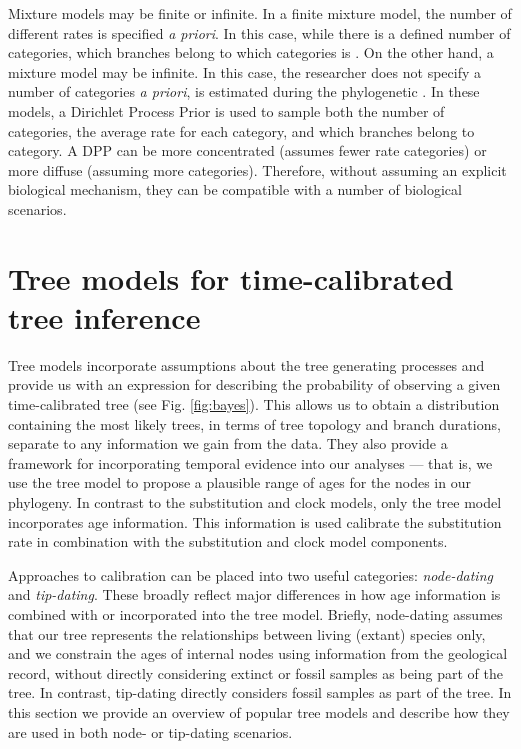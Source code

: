 Mixture models may be finite or infinite.
In a finite mixture model, the number of different rates is specified \textit{a priori}.
In this case, while there is a defined number of categories, which branches belong to which categories is .
On the other hand, a mixture model may be infinite.
In this case, the researcher does not specify a number of categories \textit{a priori},  is estimated during the phylogenetic  \citep{Heath2012a}.
In these models, a Dirichlet Process Prior  is used to sample both the number of categories, the average rate for each category, and which branches belong to  category.
A DPP can be more concentrated (assumes fewer rate categories) or more diffuse (assuming more categories).
Therefore, without assuming an explicit biological mechanism, they can be compatible with a number of biological scenarios.

\section{Tree models for time-calibrated tree inference}


Tree models incorporate assumptions about the tree generating processes and provide us with an expression for describing the probability of observing a given time-calibrated tree (see Fig. \ref{fig:bayes}). This allows us to obtain a distribution containing the most likely trees, in terms of tree topology and branch durations, separate to any information we gain from the  data.
They also provide a framework for incorporating temporal evidence into our analyses --- that is, we use the tree model to propose a plausible range of ages for the nodes in our phylogeny.
In contrast to the substitution and clock models, only the tree model incorporates age information. %
This information is used  calibrate the substitution rate in combination with the substitution and clock model components.

Approaches to calibration can be placed into two useful categories: \textit{node-dating} and \textit{tip-dating}.
These broadly reflect major differences in how age information is combined with or incorporated into the tree model.
Briefly, node-dating assumes that our tree represents the relationships between living (extant) species only, and we constrain the ages of internal nodes using information from the geological record, without directly considering extinct or fossil samples as being part of the tree.
In contrast, tip-dating directly considers fossil samples as part of the tree.
In this section we provide an overview of popular tree models and describe how they are used in both node- or tip-dating scenarios.

